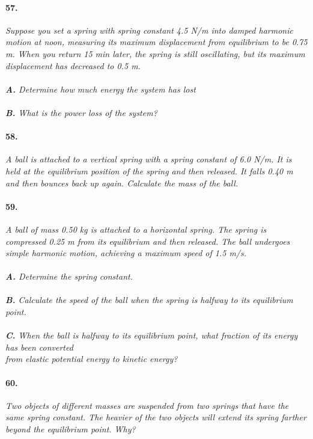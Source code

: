 \documentclass[]{article}
\begin{document}
\paragraph{57.}
\textit{
	Suppose you set a spring with spring constant
	4.5 N/m into damped harmonic motion at noon,
	measuring its maximum displacement from
	equilibrium to be 0.75 m. When you return 15 min
	later, the spring is still oscillating, but its maximum
	displacement has decreased to 0.5 m.
}\\\\	
	\indent\textit{
	\textbf{A.} Determine how much energy the system
	has lost
	}\\\\	
	\indent\textit{
	\textbf{B.} What is the power loss of the system?
	}\\	
\par
\paragraph{58.}
\textit{
	A ball is attached to a vertical spring with a spring
	constant of 6.0 N/m. It is held at the equilibrium
	position of the spring and then released. It falls
	0.40 m and then bounces back up again. Calculate
	the mass of the ball.
}\\	
\par
\paragraph{59.}
\textit{
	A ball of mass 0.50 kg is attached to a horizontal
	spring. The spring is compressed 0.25 m from its
	equilibrium and then released. The ball undergoes
	simple harmonic motion, achieving a maximum
	speed of 1.5 m/s. 
}\\\\	
	\indent\textit{
	\textbf{A.} Determine the spring constant.
	}\\\\
	\indent\textit{
	\textbf{B.} Calculate the speed of the ball when the spring is halfway to its equilibrium point.
	}\\\\
	\indent\textit{
	\textbf{C.} When the ball is halfway to its equilibrium point, what fraction of its energy has been converted\\
	\indent\indent from elastic potential energy to kinetic energy?
	}\\	
\par
\paragraph{60.}
\textit{
	Two objects of different masses are suspended from
	two springs that have the same spring constant. The
	heavier of the two objects will extend its spring farther
	beyond the equilibrium point. Why? 
}\\	
\par
\end{document}
